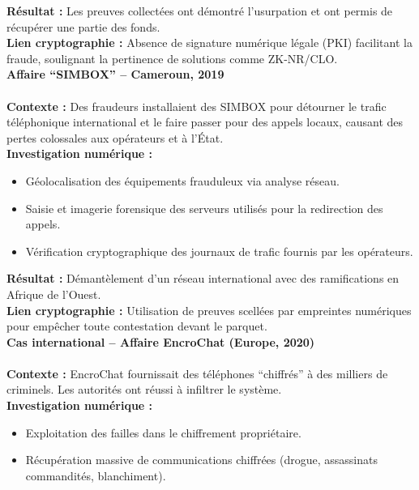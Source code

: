 \documentclass[11pt]{article}
\begin{document}
\begin{itemize}
\begin{itemize}
\textbf{Résultat :} Les preuves collectées ont démontré l’usurpation et ont permis de récupérer une partie des fonds.\\

\textbf{Lien cryptographie :} Absence de signature numérique légale (PKI) facilitant la fraude, soulignant la pertinence de solutions comme ZK-NR/CLO.\\

\textbf{Affaire “SIMBOX” – Cameroun, 2019}\\
\\

\textbf{Contexte :} Des fraudeurs installaient des SIMBOX pour détourner le trafic téléphonique international et le faire passer pour des appels locaux, causant des pertes colossales aux opérateurs et à l’État.\\

\textbf{Investigation numérique :}
\begin{itemize}
    \item Géolocalisation des équipements frauduleux via analyse réseau.
    \item Saisie et imagerie forensique des serveurs utilisés pour la redirection des appels.
    \item Vérification cryptographique des journaux de trafic fournis par les opérateurs.
\end{itemize}

\textbf{Résultat :} Démantèlement d’un réseau international avec des ramifications en Afrique de l’Ouest.\\

\textbf{Lien cryptographie :} Utilisation de preuves scellées par empreintes numériques pour empêcher toute contestation devant le parquet.\\

\textbf{ Cas international – Affaire EncroChat (Europe, 2020)}\\
\\
\textbf{Contexte :} EncroChat fournissait des téléphones “chiffrés” à des milliers de criminels. Les autorités ont réussi à infiltrer le système.\\

\textbf{Investigation numérique :}
\begin{itemize}
    \item Exploitation des failles dans le chiffrement propriétaire.
    \item Récupération massive de communications chiffrées (drogue, assassinats commandités, blanchiment).
\end{itemize}


\end{itemize}
\end{itemize}
\end{document}
